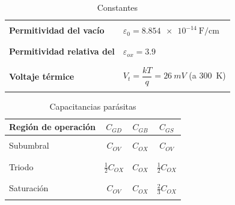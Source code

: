 \documentclass[11pt]{article}
\begin{document}
\begin{table}
	\centering
	\begin{tabular}{|l|l|}
		\hline
		                                             &                                                          \\
		\textbf{Permitividad del vacío}              & $\varepsilon_0 = \SI{8.854e-14}{\farad\per\centi\meter}$ \\
		                                             &                                                          \\
		\hline
		                                             &                                                          \\
		\textbf{Permitividad relativa del \ch{SiO2}} & $\varepsilon_{ox} = \num{3.9}$                           \\
		                                             &                                                          \\
		\hline
		                                             &                                                          \\
		\textbf{Voltaje térmice}                     & $V_t = \dfrac{kT}{q} = \SI{26}{mV}$ (a \SI{300}{K})      \\
		                                             &                                                          \\
		\hline
	\end{tabular}
	\caption{Constantes}
\end{table}

\begin{table}[h]
	\centering
	\begin{tabular}{|l|c|c|c|}
		\hline
		Región de operación & $C_{GD}$            & $C_{GB}$ & $C_{GS}$            \\
		\hline
		                    &                     &          &                     \\
		Subumbral           & $C_{OV}$            & $C_{OX}$ & $C_{OV}$            \\
		                    &                     &          &                     \\
		\hline
		                    &                     &          &                     \\
		Triodo              & $\frac{1}{2}C_{OX}$ & $C_{OX}$ & $\frac{1}{2}C_{OX}$ \\
		                    &                     &          &                     \\
		\hline
		                    &                     &          &                     \\
		Saturación          & $C_{OV}$            & $C_{OX}$ & $\frac{2}{3}C_{OX}$ \\
		                    &                     &          &                     \\
		\hline
	\end{tabular}
	\caption{Capacitancias parásitas }
\end{table}
\end{document}
